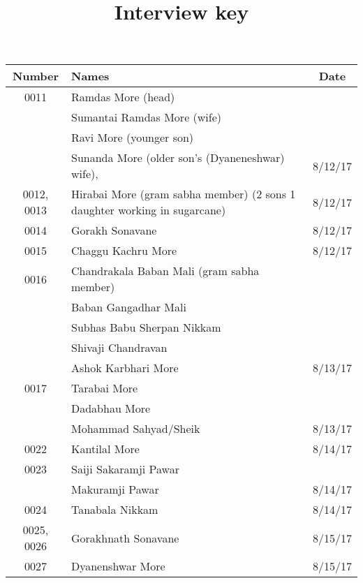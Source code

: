 \documentclass{article}
\title{Interview key}
\author{}
\date{}
\begin{document}
\maketitle

\begin{center}
\begin{tabular}{| c|p{5cm}| c|}
\hline
Number & Names & Date\\
\hline
0011 & Ramdas More (head) & \\ & Sumantai Ramdas More (wife) & \\ & Ravi More (younger son) & \\ & Sunanda More (older son's (Dyaneneshwar) wife), & 8/12/17\\
\hline
0012, 0013 & Hirabai More (gram sabha member) (2 sons 1 daughter working in sugarcane) & 8/12/17\\
\hline
0014 & Gorakh Sonavane & 8/12/17\\
\hline
0015 & Chaggu Kachru More & 8/12/17\\
\hline
0016 & Chandrakala Baban Mali (gram sabha member) & \\ & Baban Gangadhar Mali & \\ & Subhas Babu Sherpan Nikkam & \\ & Shivaji Chandravan & \\ & Ashok Karbhari More & 8/13/17\\
\hline
0017 & Tarabai More & \\ & Dadabhau More & \\ & Mohammad Sahyad/Sheik & 8/13/17\\
\hline
0022 & Kantilal More & 8/14/17\\
\hline
0023 & Saiji Sakaramji Pawar & \\ & Makuramji Pawar & 8/14/17\\
\hline
0024 & Tanabala Nikkam & 8/14/17\\
\hline
0025, 0026 & Gorakhnath Sonavane & 8/15/17\\
\hline
0027 & Dyanenshwar More & 8/15/17\\
\hline
\end{tabular}
\end{center}
\end{document}
